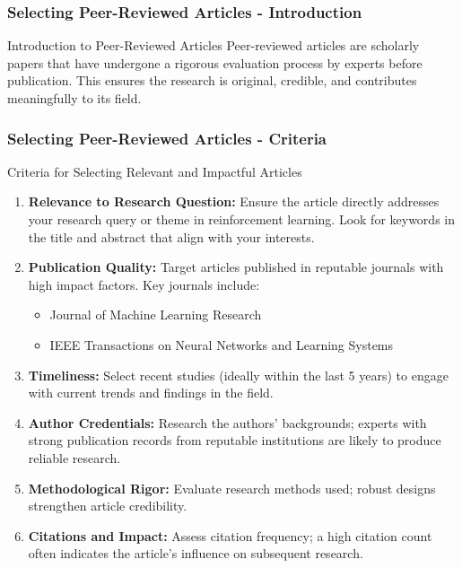 \documentclass[aspectratio=169]{beamer}
\begin{document}
\begin{frame}[fragile]
    \frametitle{Selecting Peer-Reviewed Articles - Introduction}
    \begin{block}{Introduction to Peer-Reviewed Articles}
        Peer-reviewed articles are scholarly papers that have undergone a rigorous evaluation process by experts before publication. This ensures the research is original, credible, and contributes meaningfully to its field.
    \end{block}
\end{frame}

\begin{frame}[fragile]
    \frametitle{Selecting Peer-Reviewed Articles - Criteria}
    \begin{block}{Criteria for Selecting Relevant and Impactful Articles}
        \begin{enumerate}
            \item \textbf{Relevance to Research Question:} Ensure the article directly addresses your research query or theme in reinforcement learning. Look for keywords in the title and abstract that align with your interests.
            \item \textbf{Publication Quality:} Target articles published in reputable journals with high impact factors. Key journals include:
                \begin{itemize}
                    \item Journal of Machine Learning Research
                    \item IEEE Transactions on Neural Networks and Learning Systems
                \end{itemize}
            \item \textbf{Timeliness:} Select recent studies (ideally within the last 5 years) to engage with current trends and findings in the field.
            \item \textbf{Author Credentials:} Research the authors' backgrounds; experts with strong publication records from reputable institutions are likely to produce reliable research.
            \item \textbf{Methodological Rigor:} Evaluate research methods used; robust designs strengthen article credibility.
            \item \textbf{Citations and Impact:} Assess citation frequency; a high citation count often indicates the article's influence on subsequent research.
        \end{enumerate}
    \end{block}
\end{frame}
\end{document}
